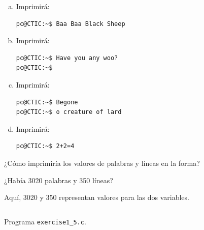 \documentclass[spanish,addpoints,answers,a4paper]{exam}
\begin{document}
\begin{questions}

\begin{solution}
\begin{multicols}{2}
\begin{enumerate}[(a)]

\item Imprimirá:

\begin{verbatim}
pc@CTIC:~$ Baa Baa Black Sheep
\end{verbatim}

\item Imprimirá:

\begin{verbatim}
pc@CTIC:~$ Have you any woo?
pc@CTIC:~$ 
\end{verbatim}

\item Imprimirá:

\begin{verbatim}
pc@CTIC:~$ Begone
pc@CTIC:~$ o creature of lard
\end{verbatim}

\item Imprimirá:

\begin{verbatim}
pc@CTIC:~$ 2+2=4
\end{verbatim}

\end{enumerate}
\end{multicols}
\end{solution}

\question ¿Cómo imprimiría los valores de palabras y líneas en la forma?

¿Había 3020 palabras y 350 líneas?

Aquí, 3020 y 350 representan valores para las dos variables.

\begin{solution}

\begin{listing}[H]
\footnotesize
\inputminted{c}{exercise1_5.c}
\caption{Programa \texttt{exercise1\_5.c}.}
\label{lst:5}
\end{listing}
\end{solution}


\end{questions}
\end{document}
